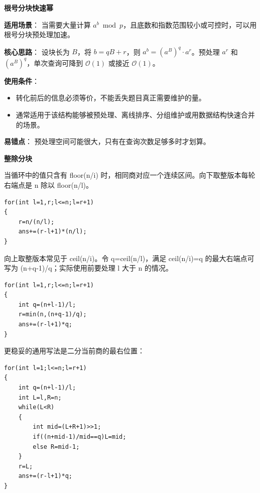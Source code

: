 \par\medskip\noindent\textbf{根号分块快速幂}\par\smallskip
\textbf{适用场景}：
当需要大量计算 $a^b\bmod p$，且底数和指数范围较小或可控时，可以用根号分块预处理加速。

\textbf{核心思路}：
设块长为 $B$，将 $b=qB+r$，则 $a^b=(a^B)^q\cdot a^r$。预处理 $a^r$ 和 $(a^B)^q$，单次查询可降到 $\mathcal{O}(1)$ 或接近 $\mathcal{O}(1)$。

\textbf{使用条件}：
\begin{itemize}
  \item 转化前后的信息必须等价，不能丢失题目真正需要维护的量。
  \item 通常适用于该结构能够被预处理、离线排序、分组维护或用数据结构快速合并的场景。
\end{itemize}

\textbf{易错点}：
预处理空间可能很大，只有在查询次数足够多时才划算。

\par\medskip\noindent\textbf{整除分块}\par\smallskip
当循环中的值只含有 floor(n/i) 时，相同商对应一个连续区间。向下取整版本每轮右端点是 n 除以 floor(n/l)。

\begin{verbatim}
for(int l=1,r;l<=n;l=r+1)
{
    r=n/(n/l);
    ans+=(r-l+1)*(n/l);
}
\end{verbatim}


向上取整版本常见于 ceil(n/i)。令 q=ceil(n/l)，满足 ceil(n/i)=q 的最大右端点可写为 (n+q-1)/q；实际使用前要处理 l 大于 n 的情况。

\begin{verbatim}
for(int l=1,r;l<=n;l=r+1)
{
    int q=(n+l-1)/l;
    r=min(n,(n+q-1)/q);
    ans+=(r-l+1)*q;
}
\end{verbatim}

更稳妥的通用写法是二分当前商的最右位置：

\begin{verbatim}
for(int l=1;l<=n;l=r+1)
{
    int q=(n+l-1)/l;
    int L=l,R=n;
    while(L<R)
    {
        int mid=(L+R+1)>>1;
        if((n+mid-1)/mid==q)L=mid;
        else R=mid-1;
    }
    r=L;
    ans+=(r-l+1)*q;
}
\end{verbatim}